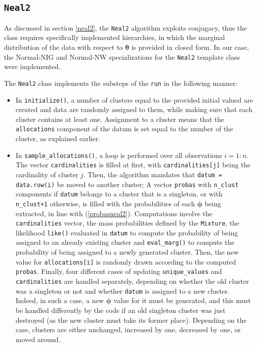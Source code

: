 \subsection{\texttt{Neal2}}
As discussed in section \ref{neal2}, the \verb|Neal2| algorithm exploits conjugacy, thus the class requires specifically implemented hierarchies, in which the marginal distribution of the data with respect to $\boldsymbol\theta$ is provided in closed form.
In our case, the Normal-NIG and Normal-NW specializations for the \verb|Neal2| template class were implemented.

The \verb|Neal2| class implements the substeps of the \verb|run| in the following manner:

\begin{itemize}
	\item In \verb|initialize()|, a number of clusters equal to the provided initial valued are created and data are randomly assigned to them, while making sure that each cluster contains at least one.
	Assignment to a cluster means that the \verb|allocations| component of the datum is set equal to the number of the cluster, as explained earlier.

	\item In \verb|sample_allocations()|, a loop is performed over all observations $i=1:n$.
	The vector \verb|cardinalities| is filled at first, with \verb|cardinalities[j]| being the cardinality of cluster $j$.
	Then, the algorithm mandates that \verb|datum = data.row(i)| be moved to another cluster;
	A vector \verb|probas| with \verb|n_clust| components if \verb|datum| belongs to a cluster that is a singleton, or with \verb|n_clust+1| otherwise, is filled with the probabilities of each $\boldsymbol\phi$ being extracted, in line with (\ref{probasneal2}).
	Computations involve the \verb|cardinalities| vector, the mass probabilities defined by the \verb|Mixture|, the likelihood \verb|like()| evaluated in \verb|datum| to compute the probability of being assigned to an already existing cluster and \verb|eval_marg()| to compute the probability of being assigned to a newly generated cluster. Then, the new value for \verb|allocations[i]| is randomly drawn according to the computed \verb|probas|.
	Finally, four different cases of updating \verb|unique_values| and \verb|cardinalities| are handled separately, depending on whether the old cluster was a singleton or not and whether \verb|datum| is assigned to a new cluster.
	Indeed, in such a case, a new $\boldsymbol\phi$ value for it must be generated, and this must be handled differently by the code if an old singleton cluster was just destroyed (as the new cluster must take its former place).
	Depending on the case, clusters are either unchanged, increased by one, decreased by one, or moved around.


\end{itemize}
